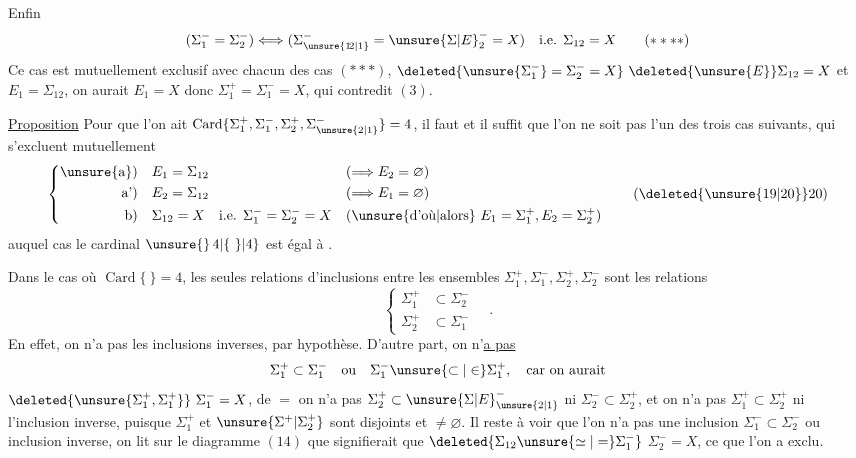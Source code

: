 Enfin
\[
(\Sigma_1^-=\Sigma_2^-)\Longleftrightarrow
(\Sigma_{\unsure{1\!2|1}}^-={\unsure{\Sigma|E}}_2^-=X)
\quad\text{i.e. }\Sigma_{12}=X
\tag*{($****$)}
\]
Ce cas est mutuellement exclusif avec chacun des cas $(***)$,   $\deleted{\unsure{\Sigma_1^-}=\Sigma_2^-=X}\ \deleted{\unsure{E}}\Sigma_{12}=X$ et $E_1=\Sigma_{12}$, on aurait $E_1=X$ donc $\Sigma_1^+=\Sigma_1^-=X$,  qui contredit $(3)$.

\uline{Proposition} Pour que l'on ait $\operatorname{Card}\{\Sigma_1^+,\Sigma_1^-,\Sigma_2^+,\Sigma_{\unsure{2|1}}^-\}=4$, il faut et il suffit que l'on ne soit pas l'un des trois cas suivants, qui s'excluent mutuellement
\[
\left\{\begin{aligned}
\text{\unsure{a})}\quad &E_1=\Sigma_{12}&&(\Longrightarrow E_2=\varnothing)\\
\text{a')}\quad &E_2=\Sigma_{12}&&(\Longrightarrow E_1=\varnothing)\\
\text{b)}\quad &\Sigma_{12}=X\quad\text{i.e. }\Sigma_1^-=\Sigma_2^-=X
   &&(\text{\unsure{d'où|alors} }E_1=\Sigma_1^+,E_2=\Sigma_2^+)
\end{aligned}\right.
\tag*{(\deleted{\unsure{19|20}}20)}
\]
auquel cas le cardinal  $\unsure{\}\,4|\{\ \}|4}$ est égal à .

\endgroup
\clearpage
\begingroup\makeatletter\tagsleft@true\makeatother
\uline{} Dans le cas où $\operatorname{Card}\{\ \}=4$,  les seules relations d'inclusions entre les ensembles $\Sigma_1^+,\Sigma_1^-,\Sigma_2^+,\Sigma_2^-$ sont les relations
\[
\left\{\begin{aligned}
\Sigma_1^+&\subset\Sigma_2^-\\
\Sigma_2^+&\subset\Sigma_1^-
\end{aligned}\right. \quad .
\tag*{($*$)}
\]
En effet, on n'a pas les inclusions inverses, par hypothèse. D'autre part, on n'\uline{a pas}
\[
\Sigma_1^+\subset\Sigma_1^- \quad\text{ou}\quad \Sigma_1^-\unsure{\subset|\in}\Sigma_1^+,\quad\text{car on aurait}
\]
$\deleted{\unsure{\Sigma_1^+,\Sigma_1^+}}\ \Sigma_1^-=X$, de $=$ on n'a pas $\Sigma_2^+\subset{\unsure{\Sigma|E}}_{\unsure{2|1}}^-$ ni $\Sigma_2^-\subset\Sigma_2^+$, et on n'a pas $\Sigma_1^+\subset\Sigma_2^+$ ni l'inclusion inverse, puisque $\Sigma_1^+$ et $\unsure{\Sigma^+|\Sigma_2^+}$ sont disjoints et $\ne\varnothing$. Il reste à voir que l'on n'a pas une inclusion $\Sigma_1^-\subset\Sigma_2^-$ ou inclusion inverse, on lit sur le diagramme $(14)$ que   signifierait que $\deleted{\Sigma_{12}\unsure{\simeq|=}\Sigma_1^-}$  $\Sigma_2^-=X$, ce que l'on a exclu.

